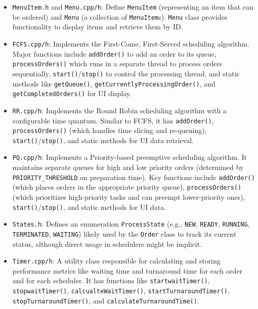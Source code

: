 \documentclass[a4paper,12pt]{article}
\begin{document}
\begin{itemize}
\begin{itemize}
\begin{itemize}
                    \item \nolinkurl{MenuItem.h} and \nolinkurl{Menu.cpp/h}: Define \nolinkurl{MenuItem} (representing an item that can be ordered) and \nolinkurl{Menu} (a collection of \nolinkurl{MenuItem}s). \nolinkurl{Menu} class provides functionality to display items and retrieve them by ID.
                    \item \nolinkurl{FCFS.cpp/h}: Implements the First-Come, First-Served scheduling algorithm. Major functions include \nolinkurl{addOrder()} to add an order to its queue, \nolinkurl{processOrders()} which runs in a separate thread to process orders sequentially, \nolinkurl{start()}/\nolinkurl{stop()} to control the processing thread, and static methods like \nolinkurl{getQueue()}, \nolinkurl{getCurrentlyProcessingOrder()}, and \nolinkurl{getCompletedOrders()} for UI display.
                    \item \nolinkurl{RR.cpp/h}: Implements the Round Robin scheduling algorithm with a configurable time quantum. Similar to FCFS, it has \nolinkurl{addOrder()}, \nolinkurl{processOrders()} (which handles time slicing and re-queuing), \nolinkurl{start()}/\nolinkurl{stop()}, and static methods for UI data retrieval.
                    \item \nolinkurl{PQ.cpp/h}: Implements a Priority-based preemptive scheduling algorithm. It maintains separate queues for high and low priority orders (determined by \nolinkurl{PRIORITY_THRESHOLD} on preparation time). Key functions include \nolinkurl{addOrder()} (which places orders in the appropriate priority queue), \nolinkurl{processOrders()} (which prioritizes high-priority tasks and can preempt lower-priority ones), \nolinkurl{start()}/\nolinkurl{stop()}, and static methods for UI data.
                    \item \nolinkurl{States.h}: Defines an enumeration \nolinkurl{ProcessState} (e.g., \nolinkurl{NEW}, \nolinkurl{READY}, \nolinkurl{RUNNING}, \nolinkurl{TERMINATED}, \nolinkurl{WAITING}) likely used by the \nolinkurl{Order} class to track its current status, although direct usage in schedulers might be implicit.
                    \item \nolinkurl{Timer.cpp/h}: A utility class responsible for calculating and storing performance metrics like waiting time and turnaround time for each order and for each scheduler. It has functions like \nolinkurl{startwaitTimer()}, \nolinkurl{stopwaitTimer()}, \nolinkurl{calcualteWaitTimer()}, \nolinkurl{startTurnaroundTimer()}, \nolinkurl{stopTurnaroundTimer()}, and \nolinkurl{calculateTurnaroundTime()}.

\end{itemize}
\end{itemize}
\end{itemize}
\end{document}
